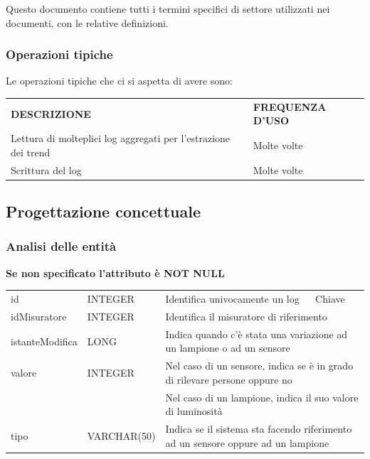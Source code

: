 Questo documento contiene tutti i termini specifici di settore utilizzati nei documenti, con le relative definizioni.

\subsubsection{Operazioni tipiche}

Le operazioni tipiche che ci si aspetta di avere sono:

\begin{center}
    \begin{tabularx}{\textwidth}{|l|X|}
        \hline
        \rowcolor{gray!30}
        \multicolumn{2}{|c|}{\textbf{OPERAZIONI TIPICHE}}
        \\
        \hline
        \rowcolor{gray!30}
        \textbf{{DESCRIZIONE}} & \textbf{{FREQUENZA D'USO}} \\
        \hline
        Lettura di molteplici log aggregati per l'estrazione dei trend & Molte volte \\
        \hline
        Scrittura del log & Molte volte\\
        \hline
    \end{tabularx}
\end{center}

\subsection{Progettazione concettuale}

\subsubsection{Analisi delle entità}

\textbf{Se non specificato l'attributo è NOT NULL}

\begin{center}
    \begin{tabularx}{\textwidth}{|l|l|l|X|}
        \hline
        \rowcolor{gray!30}
        \multicolumn{4}{|c|}{\textbf{LOG}}\\
        \hline
        id & INTEGER & Identifica univocamente un log & Chiave\\
        \hline
        idMisuratore & INTEGER & \multicolumn{2}{l|}{Identifica il misuratore di riferimento} \\
        \hline
        istanteModifica & LONG & \multicolumn{2}{l|}{Indica quando c'è stata una variazione ad un lampione o ad un sensore} \\
        \hline
        valore & INTEGER & \multicolumn{2}{l|}{Nel caso di un sensore, indica se è in grado di rilevare persone oppure no} \\
        & & \multicolumn{2}{l|}{Nel caso di un lampione, indica il suo valore di luminosità} \\
        \hline
        tipo & VARCHAR(50) & \multicolumn{2}{l|}{Indica se il sistema sta facendo riferimento ad un sensore oppure ad un lampione} \\
        \hline
    \end{tabularx}
\end{center}

